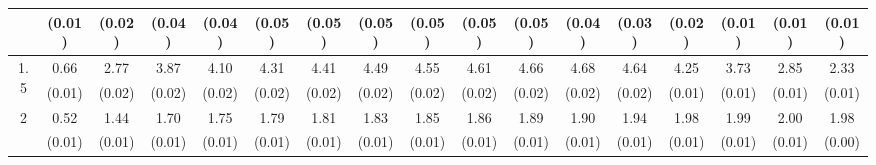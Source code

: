 \documentclass[12pt]{article}  %
\theoremstyle{plain}
\begin{document}
\begin{sidewaystable}[htbp]
\begin{tabular}{ccccccccccccccccc}
                       & (0.01)&   (0.02)&  (0.04)&  (0.04)&  (0.05)&  (0.05)&  (0.05)&  (0.05)&  (0.05)&  (0.05)&  (0.04)&  (0.03)& (0.02)& (0.01)& (0.01)& (0.01)\\ \hline                                                                                                                                                                                                                                                                                    
\multirow{2}{*}{1.5}  &  0.66 &2.77 & 3.87 & 4.10  & 4.31 &  4.41&   4.49  & 4.55 &  4.61 & 4.66 & 4.68& 4.64 &4.25& 3.73& 2.85& 2.33\\
                      &  (0.01)&   (0.02)&  (0.02)&  (0.02)&  (0.02)&  (0.02)&  (0.02)&  (0.02)&  (0.02)&  (0.02)&  (0.02)&  (0.02)& (0.01)&  (0.01)& (0.01)& (0.01)\\ \hline                                                                                                                                                                                                                                                                                    
\multirow{2}{*}{2}  &0.52& 1.44 & 1.70&  1.75  & 1.79  & 1.81  & 1.83 &  1.85  & 1.86 & 1.89&  1.90 &1.94& 1.98& 1.99& 2.00& 1.98
\\
                      &  (0.01)& (0.01)& (0.01)& (0.01)& (0.01)& (0.01)& (0.01)& (0.01)& (0.01)&  (0.01)&  (0.01)&  (0.01)&  (0.01)&  (0.01)&  (0.01)  &     (0.00)\\ \hline                                                                                                                                                                                                                                                                                    
\end{tabular}
\end{sidewaystable}
\end{document}
